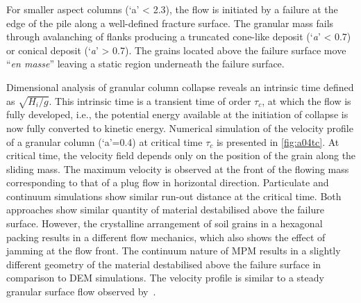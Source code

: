 For smaller aspect columns (`a' < 2.3), the flow is initiated 
by a failure at the edge of the pile along a well-defined fracture surface.
The granular mass fails through avalanching of flanks producing a 
truncated cone-like deposit (`\textit{a}' < 0.7) or conical deposit 
(`\textit{a}' > 0.7). The grains located above the failure surface move 
``\textit{en masse}'' leaving a static region underneath the failure surface. 

Dimensional analysis of granular column collapse reveals an intrinsic time 
defined as $\sqrt{H_{\textit{i}}/g}$. This intrinsic time is a transient time 
of order $\tau_{c}$, at which the flow is fully developed, i.e., the potential 
energy available at the initiation of collapse is now fully converted to 
kinetic energy. Numerical simulation of the velocity profile of a granular 
column (`a'=0.4) at critical time $\tau_{c}$ is presented in \cref{fig:a04tc}. 
At critical time, the velocity field depends only on the position of the grain 
along the sliding mass. The maximum velocity is observed at the front of the 
flowing mass corresponding to that of a plug flow in horizontal direction. 
Particulate and continuum simulations show similar run-out distance at the 
critical time. Both approaches show similar quantity of material destabilised 
above the failure surface. However, the crystalline arrangement of soil grains 
in a hexagonal packing results in a different flow mechanics, which also 
shows the effect of jamming at the flow front. The continuum nature of MPM 
results in a slightly different geometry of the material destabilised above the 
failure surface in comparison to DEM simulations. The velocity profile is 
similar to a steady granular surface flow observed by~\citet{Lajeunesse2004}. 

